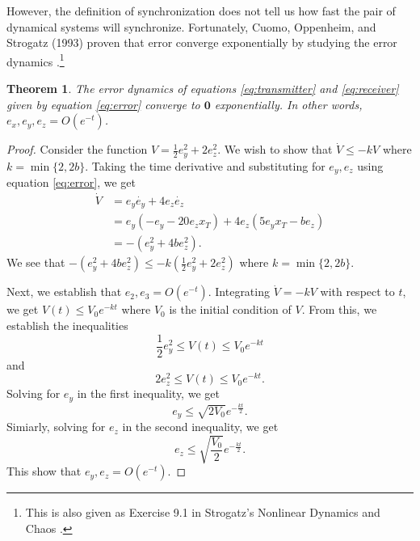 \documentclass[12pt]{article}
\newtheorem{theorem}{Theorem}[section]
\begin{document}
      However, the definition of synchronization does not tell us how fast the pair of dynamical systems will synchronize. Fortunately, Cuomo, Oppenheim, and Strogatz (1993) proven that error converge exponentially by studying the error dynamics \cite{expProof}.\footnote{This is also given as Exercise 9.1 in Strogatz's Nonlinear Dynamics and Chaos \cite{strogatz2019nonlinear}.} 
      \begin{theorem}\label{thm:error}
        The error dynamics of equations \ref{eq:transmitter} and \ref{eq:receiver} given by equation \ref{eq:error} converge to $\mathbf{0}$ exponentially. In other words, $e_x, e_y, e_z = O(e^{-t})$. 
      \end{theorem}
      \begin{proof}
        Consider the function $V=\frac{1}{2}e_y^2 + 2e_z^2$. We wish to show that $\dot{V} \leq - k V$ where $k=\min\{2,2b\}$. Taking the time derivative and substituting for $e_y,e_z$ using equation \ref{eq:error}, we get
        \begin{align*}
          \dot{V} &= e_y \dot{e_y} + 4e_z \dot{e_z} \\ 
          &= e_y (-e_y - 20e_z x_T) + 4e_z (5e_y x_T - be_z) \\
          &= - (e_y^2 + 4be_z^2). 
        \end{align*}
        We see that $- (e_y^2 + 4be_z^2) \leq -k \left( \frac{1}{2} e_y^2 + 2e_z^2 \right)$ where $k=\min\{2,2b\}$. 

        Next, we establish that $e_2,e_3 = O(e^{-t})$. Integrating $\dot{V} = -kV$ with respect to $t$, we get $V(t) \leq V_0 e^{-kt}$ where $V_0$ is the initial condition of $V$. From this, we establish the inequalities 
        \begin{equation*}
          \frac{1}{2}e_y^2 \leq V(t) \leq V_0 e^{-kt}
        \end{equation*}
        and 
        \begin{equation*}
          2e_z^2 \leq V(t) \leq V_0 e^{-kt}. 
        \end{equation*}
        Solving for $e_y$ in the first inequality, we get 
        \begin{equation*}
          e_y \leq \sqrt{2V_0} e^{-\frac{kt}{2}}. 
        \end{equation*}
        Simiarly, solving for $e_z$ in the second inequality, we get 
        \begin{equation*} 
          e_z \leq \sqrt{\frac{V_0}{2}} e^{-\frac{kt}{2}}. 
        \end{equation*}
        This show that $e_y,e_z = O(e^{-t})$. 
        

\end{proof}
\end{document}
